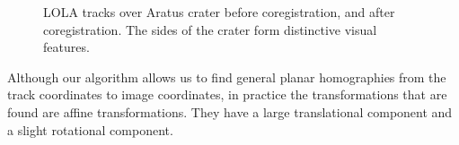 \begin{figure}
	\centering
	\caption{LOLA tracks over Aratus crater
		 before coregistration, and
		 after coregistration. The sides of the
		crater form distinctive visual features.}
	\label{fig:aratus}
\end{figure}

Although our algorithm allows us to find general planar homographies from the track coordinates to
image coordinates, in practice the transformations that are found are affine transformations. They
have a large translational component and a slight rotational component.

